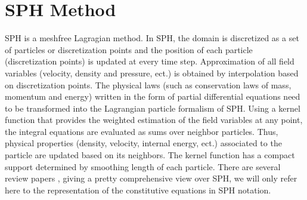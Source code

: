 \documentclass[10pt,a4paper]{article}
\begin{document}
\section{SPH Method} \label{sec:SPH_method}
SPH is a meshfree Lagragian method. In SPH, the domain is discretized as a set of particles or discretization points and the position of each particle (discretization points) is updated at every time step. Approximation of all field variables (velocity, density and pressure, ect.) is obtained by interpolation based on discretization points. The physical laws (such as conservation laws of mass, momentum and energy) written in the form of partial differential equations need to be transformed into the Lagrangian particle formalism of SPH. Using a kernel function that provides the weighted estimation of the field variables at any point, the integral equations are evaluated as sums over neighbor particles. Thus, physical properties (density, velocity, internal energy, ect.) associated to the particle are updated based on its neighbors. The kernel function has a compact support determined by smoothing length of each particle. There are several review papers \cite{monaghan1992smoothed, monaghan2005smoothed, price2012smoothed, rosswog2009astrophysical, monaghan2012smoothed}, giving a pretty comprehensive view over SPH, we will only refer here to the representation of the constitutive equations in SPH notation.
\end{document}
